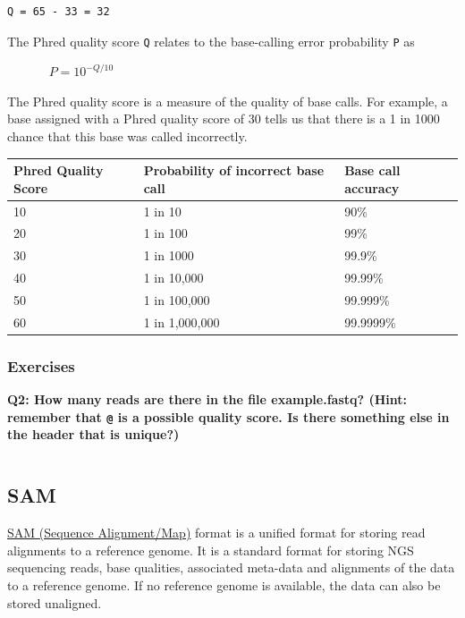 \documentclass[11pt]{article}
\makeatletter
\newcommand{\boxspacing}{\kern\kvtcb@left@rule\kern\kvtcb@boxsep}
\newcommand{\prompt}[4]{
        {\ttfamily\llap{{\color{blue}\LARGE\faKeyboardO\hspace{3pt}#4}}\vspace{-\baselineskip}}
    }
\makeatother
\begin{document}
\begin{verbatim}
Q = 65 - 33 = 32
\end{verbatim}

The Phred quality score \texttt{Q} relates to the base-calling error
probability \texttt{P} as

~~~~~~ $P = 10^{-Q/10}$

The Phred quality score is a measure of the quality of base calls. For
example, a base assigned with a Phred quality score of 30 tells us that
there is a 1 in 1000 chance that this base was called incorrectly.

\begin{longtable}[]{@{}lll@{}}
\hline
Phred Quality Score & Probability of incorrect base call & Base call
accuracy\tabularnewline
\hline
\endhead
10 & 1 in 10 & 90\%\tabularnewline
20 & 1 in 100 & 99\%\tabularnewline
30 & 1 in 1000 & 99.9\%\tabularnewline
40 & 1 in 10,000 & 99.99\%\tabularnewline
50 & 1 in 100,000 & 99.999\%\tabularnewline
60 & 1 in 1,000,000 & 99.9999\%\tabularnewline
\hline
\end{longtable}

    \hypertarget{exercises}{%
\subsubsection{Exercises}\label{exercises}}

\textbf{Q2: How many reads are there in the file example.fastq? (Hint:
remember that \texttt{@} is a possible quality score. Is there something
else in the header that is unique?)}

    \begin{tcolorbox}[breakable, size=fbox, boxrule=1pt, pad at break*=1mm,colback=cellbackground, colframe=cellborder]
\prompt{In}{incolor}{ }{\boxspacing}
\begin{Verbatim}[commandchars=\\\{\}]

\end{Verbatim}
\end{tcolorbox}

    \hypertarget{sam}{%
\subsection{SAM}\label{sam}}

\href{https://samtools.github.io/hts-specs/SAMv1.pdf}{SAM (Sequence
Alignment/Map)} format is a unified format for storing read alignments
to a reference genome. It is a standard format for storing NGS
sequencing reads, base qualities, associated meta-data and alignments of
the data to a reference genome. If no reference genome is available, the
data can also be stored unaligned.
\end{document}
